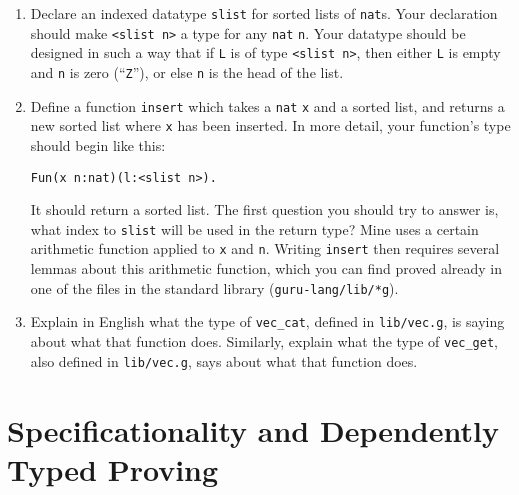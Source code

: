 \documentclass{book}[12pt]
\begin{document}
\begin{enumerate}

\item Declare an indexed datatype \texttt{slist} for sorted lists of
\texttt{nat}s.  Your declaration should make \texttt{<slist n>} a type
for any \texttt{nat} \texttt{n}.  Your datatype should be designed in
such a way that if \texttt{L} is of type \texttt{<slist n>}, then
either \texttt{L} is empty and \texttt{n} is zero (``\texttt{Z}''), or
else \texttt{n} is the head of the list.

\item Define a function \texttt{insert} which takes a \texttt{nat} \texttt{x} and
a sorted list, and returns a new sorted list where \texttt{x} has been inserted.
In more detail, your function's type should begin like this:

\begin{verbatim}
Fun(x n:nat)(l:<slist n>).
\end{verbatim}

\noindent It should return a sorted list.  The first question you
should try to answer is, what index to \texttt{slist} will be used in
the return type?  Mine uses a certain arithmetic function applied to
\texttt{x} and \texttt{n}.  Writing \texttt{insert} then requires
several lemmas about this arithmetic function, which you can find
proved already in one of the files in the standard library
(\texttt{guru-lang/lib/*g}).

\item Explain in English what the type of \texttt{vec\_cat}, defined
in \texttt{lib/vec.g}, is saying about what that function does.
Similarly, explain what the type of \texttt{vec\_get}, also defined in
\texttt{lib/vec.g}, says about what that function does.

\end{enumerate}

\chapter{Specificationality and Dependently Typed Proving}
\end{document}
